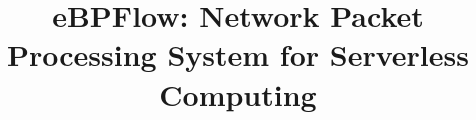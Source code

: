 \documentclass[pageno]{jpaper}
\begin{document}
\title{eBPFlow: Network Packet Processing System for Serverless Computing}

\date{}
\maketitle

\thispagestyle{empty}








%



\balance


\end{document}
